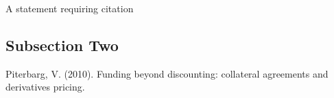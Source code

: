\documentclass[twoside,twocolumn]{article}
\begin{document}
A statement requiring citation %
\blindtext %

\subsection{Subsection Two}

\blindtext %


\begin{thebibliography}{99} %

Piterbarg, V. (2010).
\newblock Funding beyond discounting: collateral agreements and derivatives pricing.\\
 
\end{thebibliography}

\end{document}
